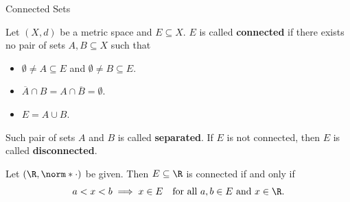 \begin{section}{Connected Sets}

Let $(X, d)$ be a metric space and $E \subseteq X$. $E$ is called \textbf{connected}
if there exists no pair of sets $A, B \subseteq X$ such that
\begin{itemize}
    \item $\emptyset \neq A \subseteq E$ and $\emptyset \neq B \subseteq E$.
    \item $\overline{A} \cap B = A \cap \overline{B} = \emptyset$.
    \item $E = A \cup B$.
\end{itemize}
Such pair of sets $A$ and $B$ is called \textbf{separated}.
If $E$ is not connected, then $E$ is called \textbf{disconnected}.

\bigskip

\begin{theorem} \label{thm:ConnectedSetsInR}
    Let $(\R, \norm*{\cdot})$ be given. Then $E \subseteq \R$ is connected if and only if
    \[
    a < x < b \implies x \in E \quad \text{for all } a, b \in E \text{ and } x \in \R.
    \]
\end{theorem}


\end{section}
